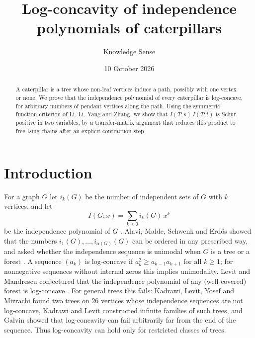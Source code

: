 \documentclass{amsart}
\theoremstyle{definition}
\theoremstyle{remark}
\numberwithin{equation}{section}
\begin{document}
\title[Log-concavity for caterpillars]{Log-concavity of independence polynomials of caterpillars}

\author{Knowledge Sense}
\address{Knowledge Sense}

\date{10 October 2026}



\begin{abstract}
A caterpillar is a tree whose non-leaf vertices induce a path, possibly with one vertex or none. We prove that the independence polynomial of every caterpillar is log-concave, for arbitrary numbers of pendant vertices along the path. Using the symmetric function criterion of Li, Li, Yang and Zhang, we show that $I(T;s)\,I(T;t)$ is Schur positive in two variables, by a transfer-matrix argument that reduces this product to free Ising chains after an explicit contraction step.
\end{abstract}

\maketitle

\section{Introduction}

For a graph $G$ let $i_k(G)$ be the number of independent sets of $G$ with $k$ vertices, and let
\[
I(G;x)=\sum_{k\ge0}i_k(G)\,x^k
\]
be the independence polynomial of $G$ \cite{GH83}. Alavi, Malde, Schwenk and Erd\H{o}s \cite{AMSE} showed that the numbers $i_1(G),\dots,i_{\alpha(G)}(G)$ can be ordered in any prescribed way, and asked whether the independence sequence is unimodal when $G$ is a tree or a forest \cite[Problem~3, p.~21]{AMSE}. A sequence $(a_k)$ is log-concave if $a_k^2\ge a_{k-1}a_{k+1}$ for all $k\ge1$; for nonnegative sequences without internal zeros this implies unimodality. Levit and Mandrescu conjectured that the independence polynomial of any (well-covered) forest is log-concave \cite[Section~3]{LM04}. For general trees this fails: Kadrawi, Levit, Yosef and Mizrachi \cite{KLYM} found two trees on $26$ vertices whose independence sequences are not log-concave, Kadrawi and Levit \cite{KL} constructed infinite families of such trees, and Galvin \cite{Gal26} showed that log-concavity can fail arbitrarily far from the end of the sequence. Thus log-concavity can hold only for restricted classes of trees.
\end{document}
